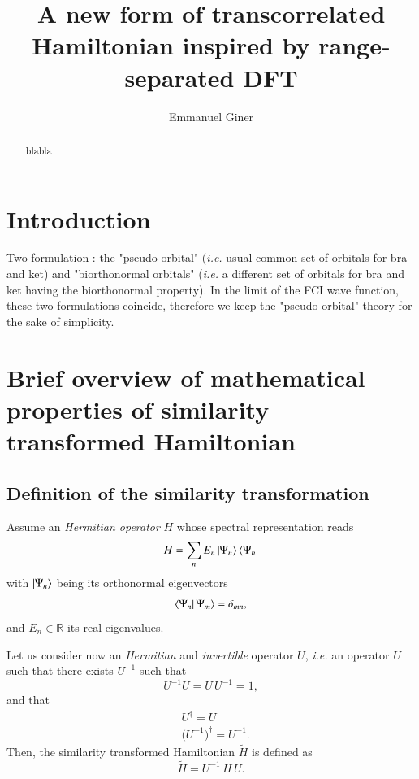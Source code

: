 \documentclass[aip,jcp,reprint,noshowkeys,superscriptaddress]{revtex4-1}
\newcommand{\R}{\mathbb{R}}
\begin{document}
	

\title{A new form of transcorrelated Hamiltonian inspired by range-separated DFT}

\author{Emmanuel Giner}

\begin{abstract}
blabla

\end{abstract}

\maketitle
\section{Introduction}
Two formulation : the "pseudo orbital" (\textit{i.e.} usual common set of orbitals for bra and ket) and "biorthonormal orbitals" (\textit{i.e.} a different set of orbitals for bra and ket having the biorthonormal property). 
In the limit of the FCI wave function, these two formulations coincide, therefore we keep the "pseudo orbital" theory for the sake of simplicity. 

\section{Brief overview of mathematical properties of similarity transformed Hamiltonian}
\subsection{Definition of the similarity transformation}
Assume an \textit{Hermitian operator} $H$ whose spectral representation reads 
\begin{equation}
 \label{eq:h_spectr}
 H  = \sum_n E_n \ket{\Psi_n}\bra{\Psi_n}
\end{equation}
with $\ket{\Psi_n}$ being its orthonormal eigenvectors 
\begin{equation}
 \bra{\Psi_n} \Psi_m \rangle = \delta_{mn},
\end{equation}
and $E_n \in \R$ its real eigenvalues. 

Let us consider now an \textit{Hermitian} and \textit{invertible} operator $U$, \textit{i.e.} an operator $U$ such that there exists $U^{-1}$ such that 
\begin{equation}
 \label{eq:u_def_1}
 U^{-1} U = U \, U^{-1} = 1,
\end{equation}
and that 
\begin{equation}
 \begin{aligned}
 \label{eq:u_def_2}
 & U^\dagger = U \\
 & \big(U^{-1}\big)^{\dagger} = U^{-1}.
 \end{aligned}
\end{equation}
Then, the similarity transformed Hamiltonian $\tilde{H}$ is defined as
\begin{equation}
 \label{eq:def_htilde}
 \tilde{H} = U^{-1}\, H \, U.
\end{equation}
\end{document}
